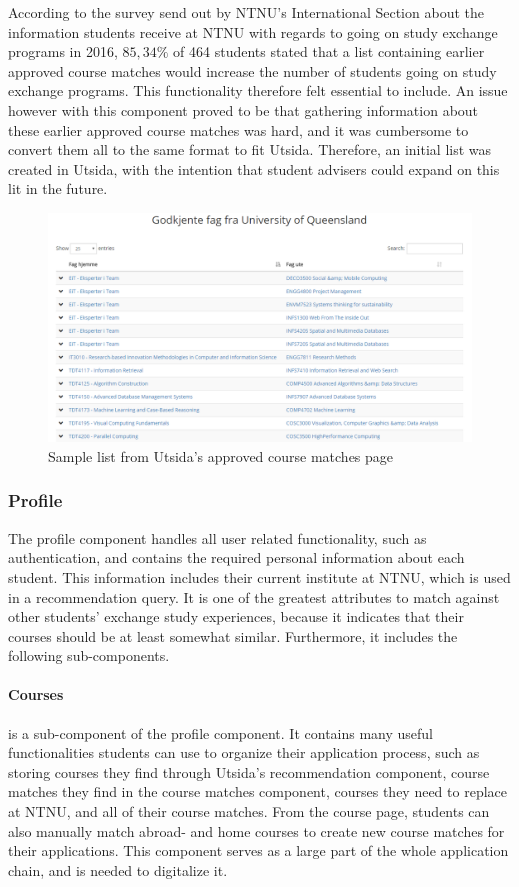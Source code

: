 According to the survey send out by NTNU's International Section about the information students receive at NTNU with regards to going on study exchange programs in 2016, $85,34\%$ of 464 students stated that a list containing earlier approved course matches would increase the number of students going on study exchange programs. This functionality therefore felt essential to include. An issue however with this component proved to be that gathering information about these earlier approved course matches was hard, and it was cumbersome to convert them all to the same format to fit Utsida. Therefore, an initial list was created in Utsida, with the intention that student advisers could expand on this lit in the future.

\begin{figure}[h]
    \centering
    \includegraphics[width=1\textwidth]{fig/utsida_screenshots/approved_courses.PNG}
    \caption{Sample list from Utsida's approved course matches page}
    \label{fig:my_label}
\end{figure}

\subsubsection{Profile}

The profile component handles all user related functionality, such as authentication, and contains the required personal information about each student. This information includes their current institute at NTNU, which is used in a recommendation query. It is one of the greatest attributes to match against other students' exchange study experiences, because it indicates that their courses should be at least somewhat similar. Furthermore, it includes the following sub-components.

\paragraph{Courses} is a sub-component of the profile component. It contains many useful functionalities students can use to organize their application process, such as storing courses they find through Utsida's recommendation component, course matches they find in the course matches component, courses they need to replace at NTNU, and all of their course matches. From the course page, students can also manually match abroad- and home courses to create new course matches for their applications. This component serves as a large part of the whole application chain, and is needed to digitalize it. 

